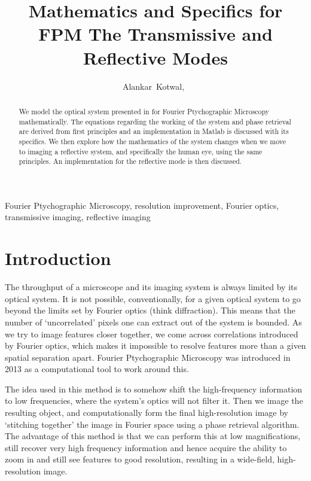 \documentclass[11pt,a4paper,journal]{IEEEtran}
\title{Mathematics and Specifics for FPM \linebreak The Transmissive and Reflective Modes}
\author{Alankar~Kotwal,~\IEEEmembership{Indian Institute of Technology Bombay}}
\begin{document}
\maketitle

\begin{abstract}
We model the optical system presented in \cite{FPMPaper} for Fourier Ptychographic Microscopy mathematically. The equations regarding the working of the system and phase retrieval are derived from first principles and an implementation in Matlab is discussed with its specifics. We then explore how the mathematics of the system changes when we move to imaging a reflective system, and specifically the human eye, using the same principles. An implementation for the reflective mode is then discussed.
\end{abstract}

\begin{keywords}
Fourier Ptychographic Microscopy, resolution improvement, Fourier optics, transmissive imaging, reflective imaging
\end{keywords}

\section{Introduction}
The throughput of a microscope and its imaging system is always limited by its optical system. It is not possible, conventionally, for a given optical system to go beyond the limits set by Fourier optics (think diffraction). This means that the number of `uncorrelated' pixels one can extract out of the system is bounded. As we try to image features closer together, we come across correlations introduced by Fourier optics, which makes it impossible to resolve features more than a given spatial separation apart. Fourier Ptychographic Microscopy was introduced in 2013 as a computational tool to work around this.

The idea used in this method is to somehow shift the high-frequency information to low frequencies, where the system's optics will not filter it. Then we image the resulting object, and computationally form the final high-resolution image by `stitching together' the image in Fourier space using a phase retrieval algorithm. The advantage of this method is that we can perform this at low magnifications, still recover very high frequency information and hence acquire the ability to zoom in and still see features to good resolution, resulting in a wide-field, high-resolution image.
\end{document}

